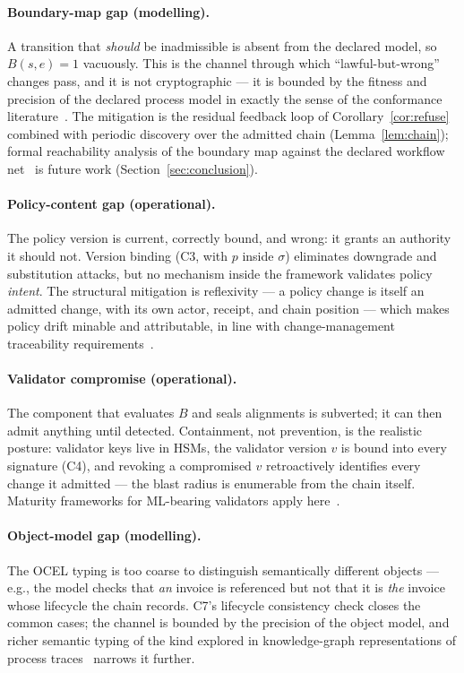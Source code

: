 \paragraph{Boundary-map gap (modelling).}
A transition that \emph{should} be inadmissible is absent from the declared
model, so $B(s,e) = 1$ vacuously. This is the channel through which
``lawful-but-wrong'' changes pass, and it is not cryptographic --- it is bounded
by the fitness and precision of the declared process model in exactly the sense
of the conformance literature~\cite{buijs_et_al_quality_dimensions_2012}. The
mitigation is the residual feedback loop of Corollary~\ref{cor:refuse} combined
with periodic discovery over the admitted chain
(Lemma~\ref{lem:chain}); formal reachability analysis of the boundary map
against the declared workflow net~\cite{van_der_aalst_wfnet_soundness_1997} is
future work (Section~\ref{sec:conclusion}).

\paragraph{Policy-content gap (operational).}
The policy version is current, correctly bound, and wrong: it grants an
authority it should not. Version binding (C3, with $p$ inside $\sigma$)
eliminates downgrade and substitution attacks, but no mechanism inside the
framework validates policy \emph{intent}. The structural mitigation is
reflexivity --- a policy change is itself an admitted change, with its own
actor, receipt, and chain position --- which makes policy drift minable and
attributable, in line with change-management traceability
requirements~\cite{change_mgmt_traceability_2016}.

\paragraph{Validator compromise (operational).}
The component that evaluates $B$ and seals alignments is subverted; it can then
admit anything until detected. Containment, not prevention, is the realistic
posture: validator keys live in HSMs, the validator version $v$ is bound into
every signature (C4), and revoking a compromised $v$ retroactively identifies
every change it admitted --- the blast radius is enumerable from the chain
itself. Maturity frameworks for ML-bearing validators apply
here~\cite{mlsmm_2023}.

\paragraph{Object-model gap (modelling).}
The OCEL typing is too coarse to distinguish semantically different objects ---
e.g., the model checks that \emph{an} invoice is referenced but not that it is
\emph{the} invoice whose lifecycle the chain records. C7's lifecycle
consistency check closes the common cases; the channel is bounded by the
precision of the object model, and richer semantic typing of the kind explored
in knowledge-graph representations of process
traces~\cite{process_trace_kg_2024,ocel_xes_sparql_2024} narrows it further.

